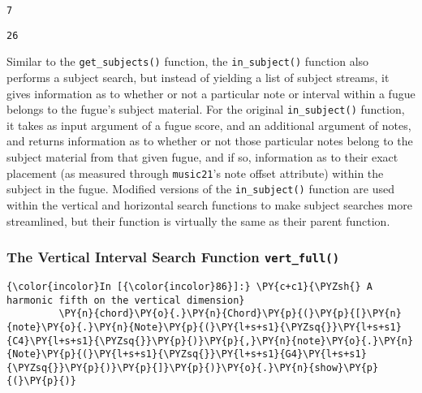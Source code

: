     \begin{center}
    \end{center}
    
    \begin{Verbatim}[commandchars=\\\{\}]
7
    \end{Verbatim}

    \begin{center}
    \end{center}
    
    \begin{Verbatim}[commandchars=\\\{\}]
26
    \end{Verbatim}

    \begin{center}
    \end{center}
    
    Similar to the \texttt{get\_subjects()} function, the
\texttt{in\_subject()} function also performs a subject search, but
instead of yielding a list of subject streams, it gives information as
to whether or not a particular note or interval within a fugue belongs
to the fugue's subject material. For the original \texttt{in\_subject()}
function, it takes as input argument of a fugue score, and an additional
argument of notes, and returns information as to whether or not those
particular notes belong to the subject material from that given fugue,
and if so, information as to their exact placement (as measured through
\texttt{music21}'s note offset attribute) within the subject in the
fugue. Modified versions of the \texttt{in\_subject()} function are used
within the vertical and horizontal search functions to make subject
searches more streamlined, but their function is virtually the same as
their parent function.

\subsubsection{\texorpdfstring{The Vertical Interval Search Function
\texttt{vert\_full()}}{The Vertical Interval Search Function vert\_full()}}\label{the-vertical-interval-search-function-vert_full}


    \begin{Verbatim}[commandchars=\\\{\}]
{\color{incolor}In [{\color{incolor}86}]:} \PY{c+c1}{\PYZsh{} A harmonic fifth on the vertical dimension}
         \PY{n}{chord}\PY{o}{.}\PY{n}{Chord}\PY{p}{(}\PY{p}{[}\PY{n}{note}\PY{o}{.}\PY{n}{Note}\PY{p}{(}\PY{l+s+s1}{\PYZsq{}}\PY{l+s+s1}{C4}\PY{l+s+s1}{\PYZsq{}}\PY{p}{)}\PY{p}{,}\PY{n}{note}\PY{o}{.}\PY{n}{Note}\PY{p}{(}\PY{l+s+s1}{\PYZsq{}}\PY{l+s+s1}{G4}\PY{l+s+s1}{\PYZsq{}}\PY{p}{)}\PY{p}{]}\PY{p}{)}\PY{o}{.}\PY{n}{show}\PY{p}{(}\PY{p}{)}
\end{Verbatim}

